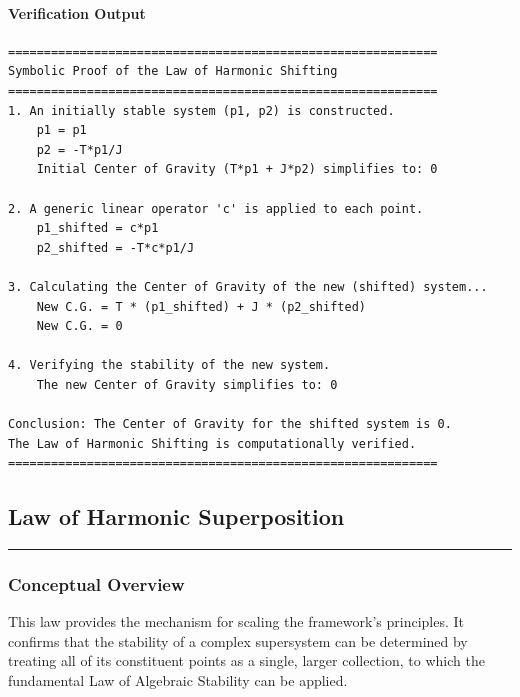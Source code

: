 \paragraph{Verification Output}
\begin{verbatim}
============================================================
Symbolic Proof of the Law of Harmonic Shifting
============================================================
1. An initially stable system (p1, p2) is constructed.
    p1 = p1
    p2 = -T*p1/J
    Initial Center of Gravity (T*p1 + J*p2) simplifies to: 0

2. A generic linear operator 'c' is applied to each point.
    p1_shifted = c*p1
    p2_shifted = -T*c*p1/J

3. Calculating the Center of Gravity of the new (shifted) system...
    New C.G. = T * (p1_shifted) + J * (p2_shifted)
    New C.G. = 0

4. Verifying the stability of the new system.
    The new Center of Gravity simplifies to: 0

Conclusion: The Center of Gravity for the shifted system is 0.
The Law of Harmonic Shifting is computationally verified.
============================================================
\end{verbatim}


\subsection*{Law of Harmonic Superposition}
\hrule
\vspace{0.3cm}
\vspace{0.5cm}

\subsubsection*{Conceptual Overview}
This law provides the mechanism for scaling the framework's principles. It confirms that the stability of a complex supersystem can be determined by treating all of its constituent points as a single, larger collection, to which the fundamental Law of Algebraic Stability can be applied.

